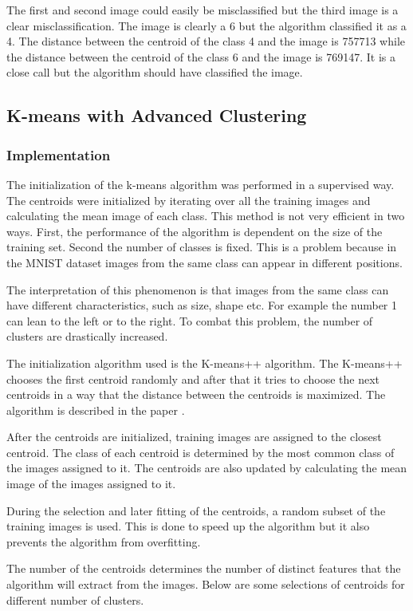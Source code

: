 The first and second image could easily be misclassified but the third image is a clear misclassification. The image is clearly a 6 but
the algorithm classified it as a 4. The distance between the centroid of the class 4 and the image is 757713 while the distance
between the centroid of the class 6 and the image is 769147. It is a close call but the algorithm should have classified the image.

\subsection{K-means with Advanced Clustering}
\subsubsection{Implementation}

The initialization of the k-means algorithm was performed in a supervised way. The centroids were initialized by iterating over all the
training images and calculating the mean image of each class. This method is not very efficient in two ways. First, the performance of
the algorithm is dependent on the size of the training set. Second the number of classes is fixed. This is a problem because in the MNIST
dataset images from the same class can appear in different positions.

The interpretation of this phenomenon is that images from the same class can have different characteristics, such as size, shape etc.
For example the number 1 can lean to the left or to the right. To combat this problem, the number of clusters are drastically increased.

The initialization algorithm used is the K-means++ algorithm. The K-means++ chooses the first centroid randomly and after that it tries
to choose the next centroids in a way that the distance between the centroids is maximized. The algorithm is described in the paper \cite{kmeans++}.

After the centroids are initialized, training images are assigned to the closest centroid. The class of each centroid is determined by the
most common class of the images assigned to it. The centroids are also updated by calculating the mean image of the images assigned to it.

During the selection and later fitting of the centroids, a random subset of the training images is used. This is done to speed up the 
algorithm but it also prevents the algorithm from overfitting.

The number of the centroids determines the number of distinct features that the algorithm will extract from the images. Below are some selections
of centroids for different number of clusters.

